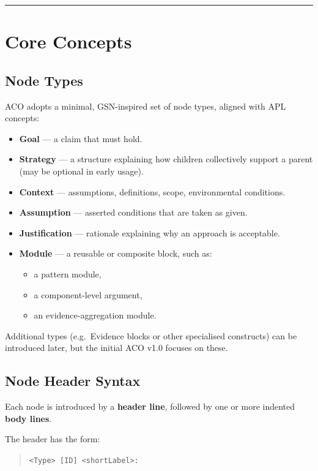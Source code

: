 \documentclass[11pt]{article}
\begin{document}
\bigskip
\hrule
\bigskip

\section{Core Concepts}

\subsection{Node Types}

ACO adopts a minimal, GSN-inspired set of node types, aligned with APL concepts:

\begin{itemize}[leftmargin=2em]
  \item \textbf{Goal} --- a claim that must hold.
  \item \textbf{Strategy} --- a structure explaining how children collectively support a parent (may be optional in early usage).
  \item \textbf{Context} --- assumptions, definitions, scope, environmental conditions.
  \item \textbf{Assumption} --- asserted conditions that are taken as given.
  \item \textbf{Justification} --- rationale explaining why an approach is acceptable.
  \item \textbf{Module} --- a reusable or composite block, such as:
  \begin{itemize}[leftmargin=1.5em]
    \item a pattern module,
    \item a component-level argument,
    \item an evidence-aggregation module.
  \end{itemize}
\end{itemize}

Additional types (e.g.\ Evidence blocks or other specialised constructs) can be introduced later, but the initial ACO v1.0 focuses on these.

\subsection{Node Header Syntax}

Each node is introduced by a \textbf{header line}, followed by one or more indented \textbf{body lines}.

The header has the form:
\begin{quote}
\texttt{\textless Type\textgreater{} [ID] \textless shortLabel\textgreater:}
\end{quote}
\end{document}
